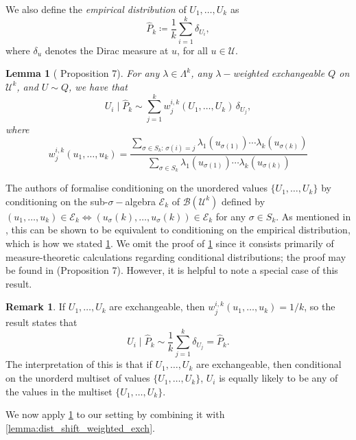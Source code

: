 \documentclass[11pt, titlepage]{article} %
\numberwithin{equation}{section}
\newtheorem{lemma}{Lemma}
\theoremstyle{definition}
\newtheorem{remark}{Remark}
\numberwithin{theorem}{section}
\numberwithin{lemma}{section}
\numberwithin{corollary}{section}
\numberwithin{proposition}{section}
\numberwithin{definition}{section}
\numberwithin{remark}{section}
\begin{document}
\noindent
We also define the \textit{empirical distribution} of \(U_1, \ldots, U_k\) as \[ \hat{P}_k \coloneqq \frac{1}{k} \sum_{i=1}^{k} \delta_{U_i}, \] where \(\delta_u\) denotes the Dirac measure at \(u\), for all \(u \in \mathcal{U}\). \vskip5pt

\noindent
\begin{lemma}[\cite{barber2024finetti} Proposition 7]
    For any \(\lambda \in \Lambda^k\), any \(\lambda-\)weighted exchangeable \(Q\) on \(\mathcal{U}^k\), and \(U \sim Q\), we have that \[U_i \mid \hat{P}_k \sim \sum_{j=1}^{k} w_{j}^{i, k}(U_1, \ldots, U_k) \, \delta_{U_j}, \] where \[w^{i, k}_j(u_1, \ldots, u_k) = \frac{ \sum_{\sigma \in S_k : \, \sigma(i) = j} \lambda_1(u_{\sigma(1)}) \cdots \lambda_k(u_{\sigma(k)})  }{\sum_{\sigma \in S_k} \lambda_1(u_{\sigma(1)}) \cdots \lambda_k(u_{\sigma(k)})}\]
\label{lemma:weighted_exch_conditional_lemma}
\end{lemma}

\noindent
The authors of \cite{barber2024finetti} formalise conditioning on the unordered values \(\{U_1, \ldots, U_k\}\) by conditioning on the sub-\(\sigma-\)algebra \(\mathcal{E}_k\) of \(\mathcal{B}(\mathcal{U}^k)\) defined by \((u_1, \ldots, u_k) \in \mathcal{E}_k \iff (u_\sigma(k), \ldots, u_\sigma(k)) \in \mathcal{E}_k\) for any \(\sigma \in S_k\). As mentioned in \cite{barber2024finetti}, this can be shown to be equivalent to conditioning on the empirical distribution, which is how we stated \cref{lemma:weighted_exch_conditional_lemma}. We omit the proof of \cref{lemma:weighted_exch_conditional_lemma} since it consists primarily of measure-theoretic calculations regarding conditional distributions; the proof may be found in \cite{barber2024finetti} (Proposition 7). However, it is helpful to note a special case of this result.
\begin{remark}
    If \(U_1, \ldots, U_k\) are exchangeable, then \(w^{i,k}_j(u_1, \ldots, u_k) = 1/k\), so the result states that \[U_i \mid \hat{P}_k \sim \frac{1}{k}\sum_{j=1}^{k} \delta_{U_j} = \hat{P}_k.\] The interpretation of this is that if \(U_1, \ldots, U_k\) are exchangeable, then conditional on the unorderd multiset of values \(\{U_1, \ldots, U_k\}\), \(U_i\) is equally likely to be any of the values in the multiset \(\{U_1, \ldots, U_k\}\).
\label{rmk:conditional_exch_dist_result}
\end{remark}

\noindent
We now apply \cref{lemma:weighted_exch_conditional_lemma} to our setting by combining it with \cref{lemma:dist_shift_weighted_exch}.
\end{document}
